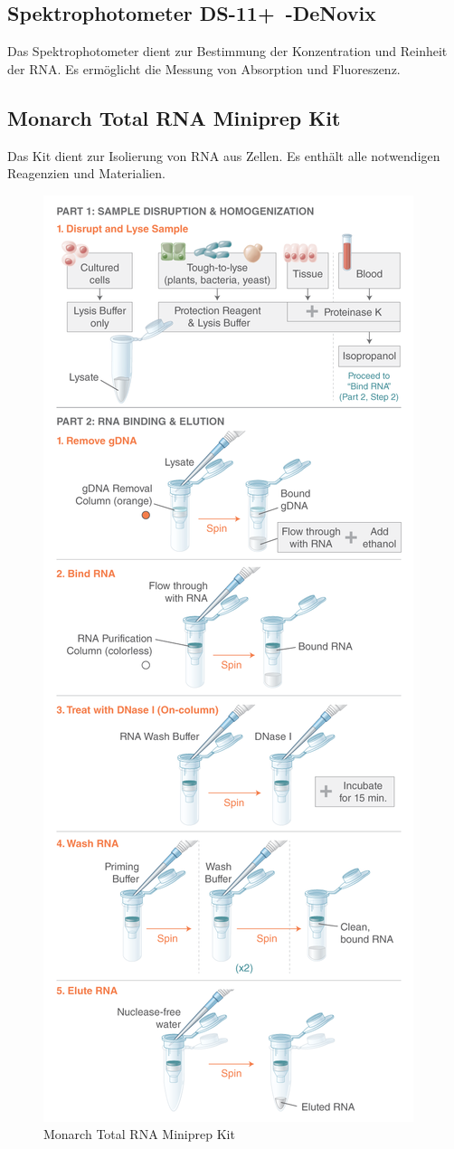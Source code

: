 \documentclass{article}
\begin{document}
\subsection*{Spektrophotometer \mbox{DS-11+ -DeNovix}}
Das Spektrophotometer dient zur Bestimmung der Konzentration und Reinheit der RNA. Es ermöglicht die Messung von Absorption und Fluoreszenz.

\subsection*{Monarch Total RNA Miniprep Kit}
Das Kit dient zur Isolierung von RNA aus Zellen. Es enthält alle notwendigen Reagenzien und Materialien.
\begin{figure}[H]
    \centering
    \includegraphics[height=\textheight]{images/monarch.png}
    \caption{Monarch Total RNA Miniprep Kit}
    \label{fig:monarch}
\end{figure}
\end{document}
